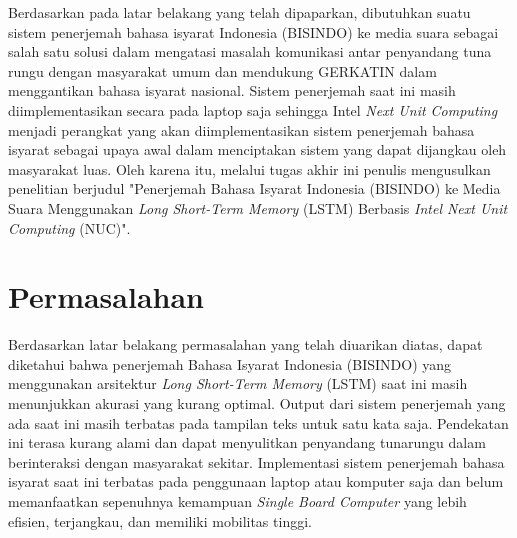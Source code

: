 
Berdasarkan pada latar belakang yang telah dipaparkan, dibutuhkan suatu sistem penerjemah bahasa isyarat Indonesia (BISINDO) ke media suara sebagai salah satu solusi dalam mengatasi masalah komunikasi antar penyandang tuna rungu dengan masyarakat umum dan mendukung GERKATIN dalam menggantikan bahasa isyarat nasional. Sistem penerjemah saat ini masih diimplementasikan secara pada laptop saja sehingga Intel \emph{Next Unit Computing} menjadi perangkat yang akan diimplementasikan sistem penerjemah bahasa isyarat sebagai upaya awal dalam menciptakan sistem yang dapat dijangkau oleh masyarakat luas. Oleh karena itu, melalui tugas akhir ini penulis mengusulkan penelitian berjudul "Penerjemah Bahasa Isyarat Indonesia (BISINDO) ke Media Suara Menggunakan \emph{Long Short-Term Memory} (LSTM) Berbasis \emph{Intel Next Unit Computing} (NUC)".    

\section{Permasalahan}
\label{sec:permasalahan}

Berdasarkan latar belakang permasalahan yang telah diuarikan diatas, dapat diketahui bahwa penerjemah Bahasa Isyarat Indonesia (BISINDO) yang menggunakan arsitektur \emph{Long Short-Term Memory} (LSTM) saat ini masih menunjukkan akurasi yang kurang optimal. Output dari sistem penerjemah yang ada saat ini masih terbatas pada tampilan teks untuk satu kata saja. Pendekatan ini terasa kurang alami dan dapat menyulitkan penyandang tunarungu dalam berinteraksi dengan masyarakat sekitar. Implementasi sistem penerjemah bahasa isyarat saat ini terbatas pada penggunaan laptop atau komputer saja dan belum memanfaatkan sepenuhnya kemampuan \emph{Single Board Computer} yang lebih efisien, terjangkau, dan memiliki mobilitas tinggi.

